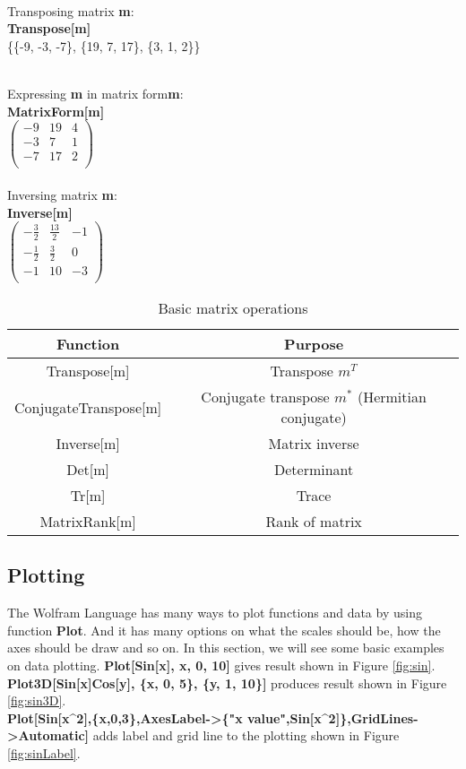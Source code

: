 ~\\
Transposing matrix \textbf{m}:\\
\textbf{Transpose[m]}\\
\{\{-9, -3, -7\}, \{19, 7, 17\}, \{3, 1, 2\}\}

~\\
Expressing \textbf{m} in matrix form\textbf{m}:\\
\textbf{MatrixForm[m]}\\
$\left(
\begin{array}{ccc}
 -9 & 19 & 4 \\
 -3 & 7 & 1 \\
 -7 & 17 & 2 \\
\end{array}
\right)$
\\~\\
Inversing matrix \textbf{m}:\\
\textbf{Inverse[m]}\\
$
\left(
\begin{array}{ccc}
 -\frac{3}{2} & \frac{13}{2} & -1 \\
 -\frac{1}{2} & \frac{3}{2} & 0 \\
 -1 & 10 & -3 \\
\end{array}
\right)
$

\begin{table}[H]
\caption{Basic matrix operations} %
\centering %
\begin{tabular}{c c}
\hline %
Function & Purpose\\
\hline %
Transpose[m] & Transpose $m^T$ \\
ConjugateTranspose[m] & Conjugate transpose $m^*$ (Hermitian conjugate) \\
Inverse[m] & Matrix inverse\\
Det[m] & Determinant\\
Tr[m] & Trace\\
MatrixRank[m] & Rank of matrix\\
[1ex] %
\hline %
\end{tabular}
\label{table:matrixOps} %
\end{table}

\subsection{Plotting}
The Wolfram Language has many ways to plot functions and data by using function \textbf{Plot}. And it has many options on what the scales should be, how the axes should be draw and so on. In this section, we will see some basic examples on data plotting.
\textbf{Plot[Sin[x], {x, 0, 10}]} gives result shown in Figure \ref{fig:sin}. \textbf{Plot3D[Sin[x]Cos[y], \{x, 0, 5\}, \{y, 1, 10\}]} produces result shown in Figure \ref{fig:sin3D}.\\
\textbf{Plot[Sin[x\string^2],\{x,0,3\},AxesLabel->\{"x value",Sin[x\string^2]\},GridLines->Automatic]} adds label and grid line to the plotting shown in Figure \ref{fig:sinLabel}.

